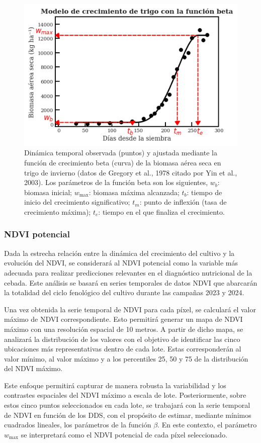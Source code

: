 \documentclass[
11pt, %
]{charter}
\begin{document}
\begin{figure}[htpb]
    \centering
    \includegraphics[width=.5\textwidth]{./Figuras/Curva_Beta.png}
    \caption{Dinámica temporal observada (puntos) y ajustada mediante la función de crecimiento beta (curva) de la biomasa aérea seca en trigo de invierno (datos de Gregory et al., 1978 citado por Yin et al., 2003). Los parámetros de la función beta son los siguientes, $w_b$: biomasa inicial; $w_{\max}$: biomasa máxima alcanzada; $t_b$: tiempo de inicio del crecimiento significativo; $t_m$: punto de inflexión (tasa de crecimiento máxima); $t_e$: tiempo en el que finaliza el crecimiento.}
    \label{fig:Curva_Beta }
\end{figure}

\subsubsection{NDVI potencial}
\label{sec:NDVI_potencial}

Dada la estrecha relación entre la dinámica del crecimiento del cultivo y la evolución del NDVI, se considerará al NDVI potencial como la variable más adecuada para realizar predicciones relevantes en el diagnóstico nutricional de la cebada. Este análisis se basará en series temporales de datos NDVI que abarcarán la totalidad del ciclo fenológico del cultivo durante las campañas 2023 y 2024.

Una vez obtenida la serie temporal de NDVI para cada píxel, se calculará el valor máximo de NDVI correspondiente. Esto permitirá generar un mapa de NDVI máximo con una resolución espacial de 10 metros. A partir de dicho mapa, se analizará la distribución de los valores con el objetivo de identificar las cinco ubicaciones más representativas dentro de cada lote. Estas corresponderán al valor mínimo, al valor máximo y a los percentiles 25, 50 y 75 de la distribución del NDVI máximo.

Este enfoque permitirá capturar de manera robusta la variabilidad y los contrastes espaciales del NDVI máximo a escala de lote. Posteriormente, sobre estos cinco puntos seleccionados en cada lote, se trabajará con la serie temporal de NDVI en función de los DDS, con el propósito de estimar, mediante mínimos cuadrados lineales, los parámetros de la función $\beta$. En este contexto, el parámetro $w_{\text{max}}$ se interpretará como el NDVI potencial de cada píxel seleccionado.
\end{document}
